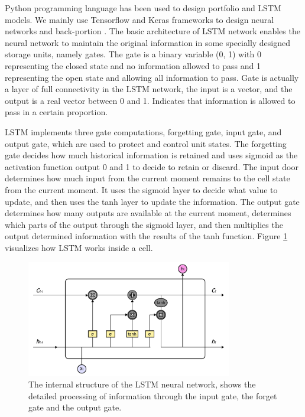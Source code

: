 \documentclass[default,iicol]{sn-jnl}%
\begin{document}
Python programming language has been used to design portfolio and LSTM models. We mainly use Tensorflow and Keras frameworks to design neural networks and back-portion \cite{Aur2017Hands}. The basic architecture of LSTM network enables the neural network to maintain the original information in some specially designed storage units, namely gates. The gate is a binary variable (0, 1) with 0 representing the closed state and no information allowed to pass and 1 representing the open state and allowing all information to pass. Gate is actually a layer of full connectivity in the LSTM network, the input is a vector, and the output is a real vector between 0 and 1. Indicates that information is allowed to pass in a certain proportion.

LSTM implements three gate computations, forgetting gate, input gate, and output gate, which are used to protect and control unit states. The forgetting gate decides how much historical information is retained and uses sigmoid as the activation function output 0 and 1 to decide to retain or discard. The input door determines how much input from the current moment remains to the cell state from the current moment. It uses the sigmoid layer to decide what value to update, and then uses the tanh layer to update the information. The output gate determines how many outputs are available at the current moment, determines which parts of the output through the sigmoid layer, and then multiplies the output determined information with the results of the tanh function. Figure \ref{fg4} visualizes how LSTM works inside a cell.
\begin{figure}[h]
	\centering    
	\includegraphics[width = 0.8\textwidth]{figures/Fig 4.png}
	\caption{The internal structure of the LSTM neural network, shows the detailed processing of information through the input gate, the forget gate and the output gate.}
	\label{fg4}
\end{figure} 
\end{document}
